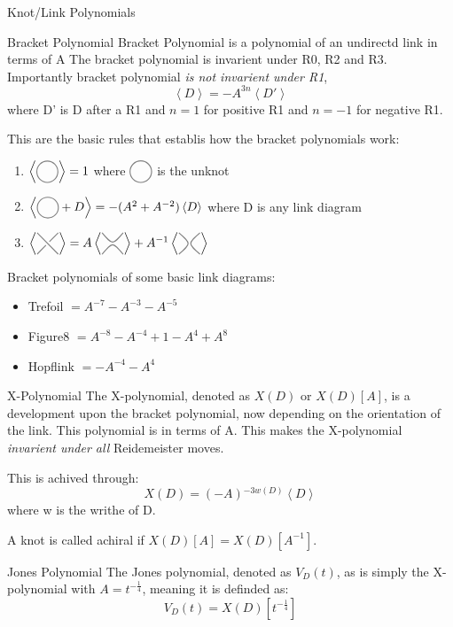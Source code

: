 \documentclass[12pt, letterpaper]{article}
\newcommand{\KP}[1]{%
  \begin{tikzpicture}[baseline=-\dimexpr\fontdimen22\textfont2\relax]
  #1
  \end{tikzpicture}%
}
\newcommand{\Circle}{%
  \KP{\filldraw[color=gray, fill=none, thick] circle (0.3);}%
}
\newcommand{\UCross}{%
  \KP{
    \draw[color=gray,thick] (-0.3,0.3) -- (0.3,-0.3);
    \draw[color=gray,thick] (-0.3,-0.3) -- (-0.05,-0.05);
    \draw[color=gray,thick] (0.05,0.05) -- (0.3,0.3);
  }%
}
\newcommand{\RSmooth}{%
  \KP{%
    \draw[color=gray,thick] (-0.3,0.3)..controls (0,-0.05).. (0.3,0.3);
    \draw[color=gray,thick] (-0.3,-0.3)..controls (0,0.05).. (0.3,-0.3);
  }%
}
\newcommand{\LSmooth}{%
  \KP{%
    \draw[color=gray,thick] (-0.3,-0.3)..controls (0.05,0).. (-0.3,0.3);
    \draw[color=gray,thick] (0.3,-0.3)..controls (-0.05,0).. (0.3,0.3);
  }%
}
\begin{document}
\begin{section}{Knot/Link Polynomials}

\begin{subsection}{Bracket Polynomial}
Bracket Polynomial is a polynomial of an undirectd link in terms of A
The bracket polynomial is invarient under R0, R2 and R3.
Importantly bracket polynomial \emph{is not invarient under R1},
\[\left\langle D \right\rangle = -A^{3n} \left\langle D' \right\rangle\]
where D' is D after a R1 and \(n=1\) for positive R1 and \(n=-1\) for negative R1.

This are the basic rules that establis how the bracket polynomials work:
\begin{enumerate}
  \item \(\left\langle \Circle \right\rangle = 1\) where \(\Circle\) is the unknot
  \item\(\left\langle \Circle + D \right\rangle =- (A^{2} + A^{-2}) \left\langle D\right\rangle\) where D is any link diagram
  \item \(\left\langle \UCross \right\rangle = A \left\langle \RSmooth \right\rangle + A^{-1} \left\langle \LSmooth \right\rangle\)
\end{enumerate}

Bracket polynomials of some basic link diagrams:
\begin{itemize}
  \item Trefoil \(= A^{-7} - A^{-3} - A^{-5}\)
  \item Figure8 \(= A^{-8} - A^{-4} + 1 - A^{4} + A^{8}\)
  \item Hopflink \(= -A^{-4} - A^{4}\)
\end{itemize}
\end{subsection}

\begin{subsection}{X-Polynomial}
The X-polynomial, denoted as \(X(D)\) or \(X(D)[A]\),
is a development upon the bracket polynomial, now depending on the orientation of the link.
This polynomial is in terms of A.
This makes the X-polynomial \emph{invarient under all} Reidemeister moves.

This is achived through: \[X(D) = (-A){}^{-3w(D)} \left\langle D \right\rangle\]
where w is the writhe of D.

A knot is called achiral if \(X(D)[A] = X(D)[A^{-1}]\).
\end{subsection}

\begin{subsubsection}{Jones Polynomial}
The Jones polynomial, denoted as \(V_{D}(t)\), as is simply the X-polynomial with \(A = t^{-\frac{1}{4}}\), meaning it is definded as:
\[V_{D}(t) = X(D)[t^{-\frac{1}{4}}]\]
\end{subsubsection}


\end{section}
\end{document}

